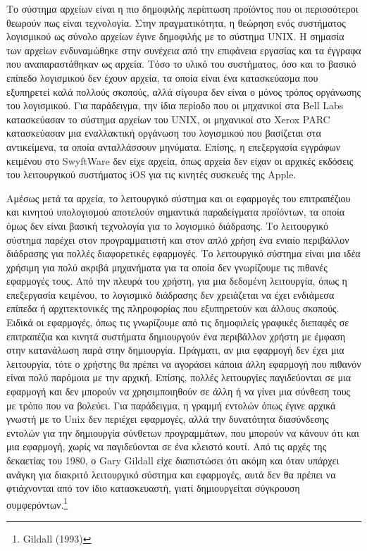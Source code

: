 \documentclass[
]{article}
\begin{document}
Το σύστημα αρχείων είναι η πιο δημοφιλής περίπτωση προϊόντος που οι
περισσότεροι θεωρούν πως είναι τεχνολογία. Στην πραγματικότητα, η
θεώρηση ενός συστήματος λογισμικού ως σύνολο αρχείων έγινε δημοφιλής με
το σύστημα UNIX. Η σημασία των αρχείων ενδυναμώθηκε στην συνέχεια από
την επιφάνεια εργασίας και τα έγγραφα που αναπαραστάθηκαν ως αρχεία.
Τόσο το υλικό του συστήματος, όσο και το βασικό επίπεδο λογισμικού δεν
έχουν αρχεία, τα οποία είναι ένα κατασκεύασμα που εξυπηρετεί καλά
πολλούς σκοπούς, αλλά σίγουρα δεν είναι ο μόνος τρόπος οργάνωσης του
λογισμικού. Για παράδειγμα, την ίδια περίοδο που οι μηχανικοί στα Bell
Labs κατασκεύασαν το σύστημα αρχείων του UNIX, οι μηχανικοί στο Xerox
PARC κατασκεύασαν μια εναλλακτική οργάνωση του λογισμικού που βασίζεται
στα αντικείμενα, τα οποία ανταλλάσσουν μηνύματα. Επίσης, η επεξεργασία
εγγράφων κειμένου στο SwyftWare δεν είχε αρχεία, όπως αρχεία δεν είχαν
οι αρχικές εκδόσεις του λειτουργικού συστήματος iOS για τις κινητές
συσκευές της Apple.

Αμέσως μετά τα αρχεία, το λειτουργικό σύστημα και οι εφαρμογές του
επιτραπέζιου και κινητού υπολογισμού αποτελούν σημαντικά παραδείγματα
προϊόντων, τα οποία όμως δεν είναι βασική τεχνολογία για το λογισμικό
διάδρασης. Το λειτουργικό σύστημα παρέχει στον προγραμματιστή και στον
απλό χρήση ένα ενιαίο περιβάλλον διάδρασης για πολλές διαφορετικές
εφαρμογές. Το λειτουργικό σύστημα είναι μια ιδέα χρήσιμη για πολύ ακριβά
μηχανήματα για τα οποία δεν γνωρίζουμε τις πιθανές εφαρμογές τους. Από
την πλευρά του χρήστη, για μια δεδομένη λειτουργία, όπως η επεξεργασία
κειμένου, το λογισμικό διάδρασης δεν χρειάζεται να έχει ενδιάμεσα
επίπεδα ή αρχιτεκτονικές της πληροφορίας που εξυπηρετούν και άλλους
σκοπούς. Ειδικά οι εφαρμογές, όπως τις γνωρίζουμε από τις δημοφιλείς
γραφικές διεπαφές σε επιτραπέζια και κινητά συστήματα δημιουργούν ένα
περιβάλλον χρήστη με έμφαση στην κατανάλωση παρά στην δημιουργία.
Πράγματι, αν μια εφαρμογή δεν έχει μια λειτουργία, τότε ο χρήστης θα
πρέπει να αγοράσει κάποια άλλη εφαρμογή που πιθανόν είναι πολύ παρόμοια
με την αρχική. Επίσης, πολλές λειτουργίες παγιδεύονται σε μια εφαρμογή
και δεν μπορούν να χρησιμποιηθούν σε άλλη ή να γίνει μια σύνθεση τους με
τρόπο που να βολεύει. Για παράδειγμα, η γραμμή εντολών όπως έγινε αρχικά
γνωστή με το Unix δεν περιέχει εφαρμογές, αλλά την δυνατότητα
διασύνδεσης εντολών για την δημιουργία σύνθετων προγραμμάτων, που
μπορούν να κάνουν ότι και μια εφαρμογή, χωρίς να παγιδεύονται σε ένα
κλειστό κουτί. Από τις αρχές της δεκαετίας του 1980, ο Gary Gildall είχε
διαπιστώσει ότι ακόμη και όταν υπάρχει ανάγκη για διακριτό λειτουργικό
σύστημα και εφαρμογές, αυτά δεν θα πρέπει να φτιάχνονται από τον ίδιο
κατασκευαστή, γιατί δημιουργείται σύγκρουση συμφερόντων.\footnote{Gildall
  (1993)}
\end{document}
